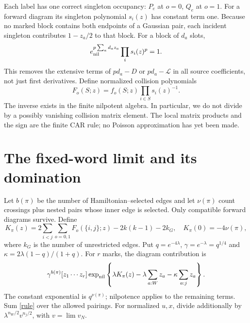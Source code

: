 \documentclass[11pt]{article}
\begin{document}
Each label has one correct singleton occupancy: $P_e$ at $o=0$,
$Q_e$ at $o=1$. For a forward diagram its singleton polynomial
$s_i(z)$ has constant term one. Because no marked block contains
both endpoints of a Gaussian pair, each incident singleton contributes
$1-z_a/2$ to that block. For a block of $d_a$ slots,
\begin{equation}\label{cancel}
 e_{\rm nil}^{p\sum_a d_a z_a}\prod_i s_i(z)^p=1.
\end{equation}
This removes the extensive terms of $pd_a-D$ or
$pd_a-\mathcal L$ in all source coefficients, not just first
derivatives. Define normalized collision polynomials
\begin{equation}\label{ratio}
 F_o(S;z)=f_o(S;z)\prod_{i\in S}s_i(z)^{-1}.
\end{equation}
The inverse exists in the finite nilpotent algebra. In particular,
we do not divide by a possibly vanishing collision matrix element.
The local matrix products and the sign are the finite CAR rule;
no Poisson approximation has yet been made.

\newpage
\section{The fixed-word limit and its domination}
Let $b(\pi)$ be the number of Hamiltonian--selected edges and let
$\nu(\pi)$ count crossings plus nested pairs whose inner edge is
selected. Only compatible forward diagrams survive. Define
\begin{equation}\label{K}
 K_\pi(z)=2\sum_{i<j}\sum_{o=0,1}F_o(\{i,j\};z)
                 -2k(k-1)-2k_G,
 \quad K_\pi(0)=-4\nu(\pi),
\end{equation}
where $k_G$ is the number of unrestricted edges. Put
$q=e^{-4\lambda}$, $\gamma=e^{-\lambda}=q^{1/4}$ and
$\kappa=2\lambda(1-q)/(1+q)$. For $r$ marks, the diagram contribution is
\begin{equation}\label{rule}
 \gamma^{b(\pi)}[z_1\cdots z_r]
 \exp_{\rm nil}\left\{\lambda K_\pi(z)
       -\lambda\sum_{a:W}z_a-\kappa\sum_{a:j}z_a\right\}.
\end{equation}
The constant exponential is $q^{\nu(\pi)}$; nilpotence applies to
the remaining terms. Sum \eqref{rule} over the allowed pairings.
For normalized $u,x$, divide additionally by
$\lambda^{n_W/2}v^{n_j/2}$, with $v=\lim v_N$.
\end{document}
